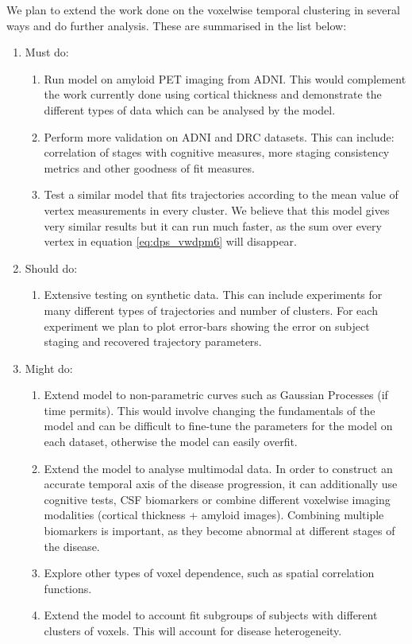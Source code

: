 We plan to extend the work done on the voxelwise temporal clustering in several ways and do further analysis. These are summarised in the list below:
\begin{enumerate}
 \item Must do:
 \begin{enumerate}
  \item Run model on amyloid PET imaging from ADNI. This would complement the work currently done using cortical thickness and demonstrate the different types of data which can be analysed by the model. 
  \item Perform more validation on ADNI and DRC datasets. This can include: correlation of stages with cognitive measures, more staging consistency metrics and other goodness of fit measures.
  \item Test a similar model that fits trajectories according to the mean value of vertex measurements in every cluster. We believe that this model gives very similar results but it can run much faster, as the sum over every vertex in equation \ref{eq:dps_vwdpm6} will disappear. 
 \end{enumerate}
 \item Should do:
 \begin{enumerate}
  \item Extensive testing on synthetic data. This can include experiments for many different types of trajectories and number of clusters. For each experiment we plan to plot error-bars showing the error on subject staging and recovered trajectory parameters.
 \end{enumerate}
 \item Might do:
 \begin{enumerate}
  \item Extend model to non-parametric curves such as Gaussian Processes (if time permits). This would involve changing the fundamentals of the model and can be difficult to fine-tune the parameters for the model on each dataset, otherwise the model can easily overfit. 
  \item Extend the model to analyse multimodal data. In order to construct an accurate temporal axis of the disease progression, it can additionally use cognitive tests, CSF biomarkers or combine different voxelwise imaging modalities (cortical thickness + amyloid images). Combining multiple biomarkers is important, as they become abnormal at different stages of the disease. 
  \item Explore other types of voxel dependence, such as spatial correlation functions. 
  \item Extend the model to account fit subgroups of subjects with different clusters of voxels. This will account for disease heterogeneity.
 \end{enumerate}
\end{enumerate}


